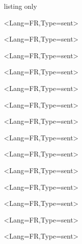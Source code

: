 \documentclass[french,11pt,a4paper]{article}
\begin{document}
\begin{DemoCode}{listing only}
\begin{EnvtExo}%
\ipsum<Lang=FR,Type=sent>
\end{EnvtExo}

\begin{EnvtExo}[Trait=pointilles]%
\ipsum<Lang=FR,Type=sent>
\end{EnvtExo}

\begin{EnvtExo}[Trait=dashilles]%
\ipsum<Lang=FR,Type=sent>
\end{EnvtExo}

\begin{EnvtExo}[Decoration=Icone/\faPython]%
\ipsum<Lang=FR,Type=sent>
\end{EnvtExo}

\begin{EnvtExo}[Decoration=Ceinture/rouge]%
\ipsum<Lang=FR,Type=sent>
\end{EnvtExo}

\begin{EnvtExo}[Decoration=Chrono/20]%
\ipsum<Lang=FR,Type=sent>
\end{EnvtExo}

\begin{EnvtExo}[Decoration=Image/goku_ssj4]%
\ipsum<Lang=FR,Type=sent>
\end{EnvtExo}

\begin{EnvtExo}[Decoration=Image/sseiya_shura]%
\ipsum<Lang=FR,Type=sent>
\end{EnvtExo}

\begin{EnvtExo}[Decoration=Points/7]%
\ipsum<Lang=FR,Type=sent>
\end{EnvtExo}

\begin{EnvtExo}[Type=Perso/{Titre perso }]%
\ipsum<Lang=FR,Type=sent>
\end{EnvtExo}

\StyleEnvtExo[Couleur=red,Police=\bfseries\ttfamily,EpTrait=2pt,Libelle={Exercice n°}]

\begin{EnvtExo}[Decoration=Icone/\faAddressBook]%
\ipsum<Lang=FR,Type=sent>
\end{EnvtExo}

\begin{EnvtExo}[Type=Perso/{Titre perso },Decoration=Chrono/25,Couleur=red,Trait=dashilles]%
\ipsum<Lang=FR,Type=sent>
\end{EnvtExo}

\StyleEnvtExoDefaut

\begin{EnvtExo}%
	[Type=Perso/{Titre perso~},Decoration=Image/goku_ssj4,Trait=non,Compteur=false]%
\ipsum<Lang=FR,Type=sent>
\end{EnvtExo}

\TitreExo[Type=Perso/{Annexe Exercice 3},Compteur=false,Decoration=Image/sseiya_aiolos]%

\ipsum<Lang=FR,Type=sent>
\end{DemoCode}
\end{document}
